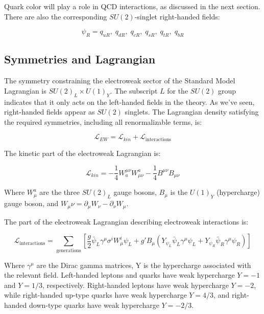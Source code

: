 Quark color will play a role in QCD interactions, as discussed in the next section.
There are also the corresponding $SU(2)$-singlet right-handed fields:

\begin{equation}\label{eq:right_handed_quarks}
\psi_R = q_{uR},\; q_{dR},\; q_{cR},\; q_{sR},\; q_{tR},\; q_{bR}
\end{equation}

\subsection{Symmetries and Lagrangian}\label{subsec:ew_lagrangian}
The symmetry constraining the electroweak sector of the Standard Model Lagrangian is $SU(2)_L \times U(1)_Y$.
The subscript $L$ for the $SU(2)$ group indicates that it only acts on the left-handed fields in the theory.
As we've seen, right-handed fields appear as $SU(2)$ singlets.
The Lagrangian density satisfying the required symmetries, including all renormalizable terms, is:

\begin{equation}\label{eq:ew_lagrangian}
    \mathcal{L}_{EW} = \mathcal{L}_{kin} + \mathcal{L}_{\text{interactions}}
\end{equation}

The kinetic part of the electroweak Lagrangian is:

\begin{equation}\label{eq:ew_kin}
    \mathcal{L}_{kin} = -\frac{1}{4}W^{\mu \nu}_{a}W_{\mu \nu}^{a}-\frac{1}{4}B^{\mu \nu}B_{\mu \nu}
\end{equation}

Where $W_\mu^a$ are the three $SU(2)_L$ gauge bosons, $B_\mu$ is the $U(1)_Y$ (hypercharge) gauge boson,
and $W_\mu\nu = \partial_{\mu} W_{\nu} - \partial_{\nu} W_{\mu}$.

The part of the electroweak Lagrangian describing electroweak interactions is:

\begin{equation}\label{eq:ew_int}
    \mathcal{L}_{\text{interactions}} = \sum_{\text{generations}}\left[\frac{g}{2}\bar{\psi}_{L}\gamma^\mu\sigma^i W_\mu^i \psi_L+
    g'B_\mu\left(Y_{\psi_L}\bar{\psi}_L\gamma^\mu\psi_L + Y_{\psi_R}\bar{\psi}_R\gamma^\mu \psi_R\right)\right]
\end{equation}

Where $\gamma^\mu$ are the Dirac gamma matrices, Y is the hypercharge associated with the relevant field.
Left-handed leptons and quarks have weak hypercharge $Y = -1$ and $Y = 1/3$, respectively.
Right-handed leptons have weak hypercharge $Y = -2$, while right-handed up-type quarks have weak hypercharge $Y = 4/3$,
and right-handed down-type quarks have weak hypercharge $Y = -2/3$.

